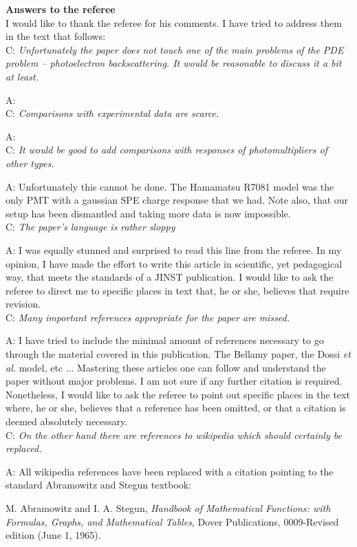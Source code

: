 \documentclass[a4paper,11pt]{article}
\begin{document}
{\bf Answers to the referee}
\\[1ex]

I would like to thank the referee for his comments. 
I have tried to address them in the text that follows: 
\\[1ex]

C: \emph{Unfortunately the paper does not touch one of the main problems of the PDE problem -- photoelectron backscattering. 
It would be reasonable to discuss it a bit at least.}

A:
\\[1ex]

C: \emph{Comparisons with experimental data are scarce.}

A:
\\[1ex]

C: \emph{It would be good to add comparisons with responses of photomultipliers of other types. }

A: Unfortunately this cannot be done. 
The Hamamatsu R7081 model was the only PMT with a gaussian SPE charge response that we had. 
Note also, that our setup has been dismantled and taking more data is now impossible.  
\\[1ex]

C: \emph{The paper's language is rather sloppy}

A: I was equally stunned and surprised to read this line from the referee. 
In my opinion, I have made the effort to write this article in scientific, yet pedagogical way, that meets the standards of a JINST publication. 
I would like to ask the referee to direct me to specific places in text that, he or she, believes that require revision. 
\\[1ex]

C: \emph{Many important references appropriate for the paper are missed.}

A: I have tried to include the minimal amount of references necessary to go through the material covered in this publication. 
The Bellamy paper, the Dossi \emph{et al.} model, etc ... Mastering these articles one can follow and understand the paper without major problems. 
I am not sure if any further citation is required. 
Nonetheless, I would like to ask the referee to point out specific places in the text where, he or she, believes that a reference has been omitted, or that a citation is deemed absolutely necessary.  
\\[1ex]

C: \emph{On the other hand there are references to wikipedia which should certainly be replaced. }

A: All wikipedia references have been replaced with a citation pointing to the standard Abramowitz and Stegun textbook:

M. Abramowitz and I. A. Stegun, \emph{Handbook of Mathematical Functions: with Formulas, Graphs, and Mathematical Tables}, Dover Publications, 0009-Revised edition (June 1, 1965).  
\end{document}
